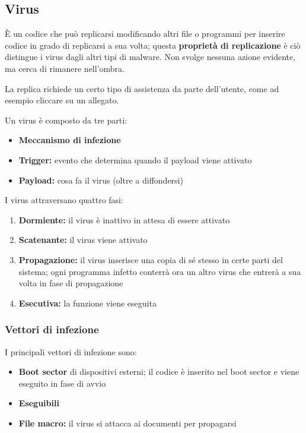 \documentclass{report}
\begin{document}
\subsection{Virus}
È un codice che può replicarsi modificando altri file o programmi per inserire codice in 
grado di replicarsi a sua volta; questa \textbf{proprietà di replicazione} è ciò distingue 
i virus dagli altri tipi di malware. Non svolge nessuna azione evidente, ma cerca di rimanere 
nell'ombra.

\noindent La replica richiede un certo tipo di assistenza da parte dell'utente, come ad esempio
cliccare su un allegato.

\noindent Un virus è composto da tre parti:
\begin{itemize}
    \item \textbf{Meccanismo di infezione}
    \item \textbf{Trigger:} evento che determina quando il payload viene attivato
    \item \textbf{Payload:} cosa fa il virus (oltre a diffondersi)
\end{itemize}

\noindent I virus attraversano quattro fasi:
\begin{enumerate}
    \item \textbf{Dormiente:} il virus è inattivo in attesa di essere attivato 
    \item \textbf{Scatenante:} il virus viene attivato 
    \item \textbf{Propagazione:} il virus inserisce una copia di sé stesso in certe parti del sistema; ogni programma 
    infetto conterrà ora un altro virus che entrerà a sua volta in fase di propagazione 
    \item \textbf{Esecutiva:} la funzione viene eseguita
\end{enumerate}

\subsubsection{Vettori di infezione}
I principali vettori di infezione sono:
\begin{itemize}
    \item \textbf{Boot sector} di dispositivi esterni; il codice è inserito nel boot sector e viene 
    eseguito in fase di avvio 
    \item \textbf{Eseguibili}
    \item \textbf{File macro:} il virus si attacca ai documenti per propagarsi 
\end{itemize}
\end{document}
